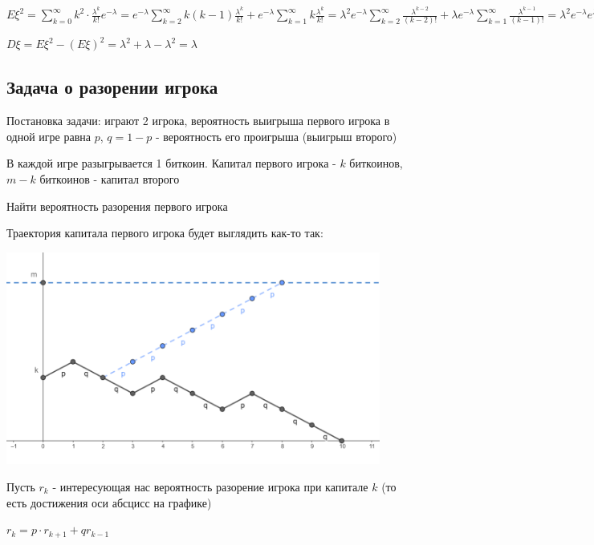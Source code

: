 \documentclass[12pt]{article}
\begin{document}
    
    $E\xi^2 = \sum_{k = 0}^\infty k^2 \cdot \frac{\lambda^k}{k!}e^{-\lambda} = e^{-\lambda} \sum_{k = 2}^\infty k(k - 1) \frac{\lambda^k}{k!} + 
    e^{-\lambda} \sum_{k = 1}^\infty k \frac{\lambda^k}{k!} = \lambda^2 e^{-\lambda} \sum_{k = 2}^\infty \frac{\lambda^{k - 2}}{(k - 2)!} + 
    \lambda e^{-\lambda} \sum_{k = 1}^\infty \frac{\lambda^{k - 1}}{(k - 1)!} = \lambda^2 e^{-\lambda} e^\lambda + \lambda e^{-\lambda} e^\lambda = \lambda^2 + \lambda$

    $D\xi = E\xi^2 - (E\xi)^2 = \lambda^2 + \lambda - \lambda^2 = \lambda$

    \clearpage

    \subsection{Задача о разорении игрока}

    Постановка задачи: играют 2 игрока, вероятность выигрыша первого игрока в одной игре равна $p$, $q = 1 - p$ - вероятность его проигрыша (выигрыш второго)

    В каждой игре разыгрывается 1 биткоин. Капитал первого игрока - $k$ биткоинов, $m - k$ биткоинов - капитал второго

    Найти вероятность разорения первого игрока

    Траектория капитала первого игрока будет выглядить как-то так:

    \begin{center}
        \includegraphics[height=7cm]{probtheory/images/probtheory_2024_10_15_1}
    \end{center}

    Пусть $r_k$ - интересующая нас вероятность разорение игрока при капитале $k$ (то есть достижения оси абсцисс на графике)

    $r_k = p \cdot r_{k + 1} + q r_{k - 1}$
\end{document}
